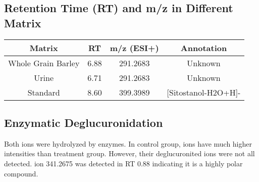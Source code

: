\subsection{Retention Time (RT) and m/z in Different Matrix}
\begin{tabular}{|c|c|c|c|}
	\hline 
	Matrix & RT & m/z (ESI+) & Annotation \\ 
	\hline 
	Whole Grain Barley & 6.88 & 291.2683 & Unknown \\ 
	\hline 
	Urine & 6.71 & 291.2683 & Unknown \\ 
	\hline 
	Standard & 8.60 & 399.3989 & [Sitostanol-H2O+H]- \\ 
	\hline 
\end{tabular} 

\subsection{Enzymatic Deglucuronidation}
Both ions were hydrolyzed by enzymes. In control group, ions have much higher intensities than treatment group.
However, their deglucuronited ions were not all detected.
ion 341.2675 was detected in RT 0.88 indicating it is a highly polar compound.

